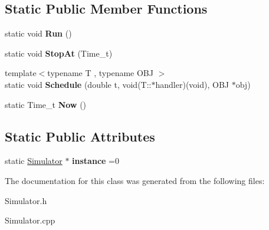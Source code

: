 \subsection*{Static Public Member Functions}
\begin{DoxyCompactItemize}
\item 
\hypertarget{class_simulator_a27e7045e7aa4e29e9d2003aaa09c8326}{static void {\bfseries Run} ()}\label{class_simulator_a27e7045e7aa4e29e9d2003aaa09c8326}

\item 
\hypertarget{class_simulator_a4bbb179ecbac8adfee23bd49d19746c0}{static void {\bfseries Stop\-At} (Time\-\_\-t)}\label{class_simulator_a4bbb179ecbac8adfee23bd49d19746c0}

\item 
\hypertarget{class_simulator_ae9f1c5a28f2fc0d42ccead5d7d2a642d}{{\footnotesize template$<$typename T , typename O\-B\-J $>$ }\\static void {\bfseries Schedule} (double t, void(T\-::$\ast$handler)(void), O\-B\-J $\ast$obj)}\label{class_simulator_ae9f1c5a28f2fc0d42ccead5d7d2a642d}

\item 
\hypertarget{class_simulator_a4a9507b155c22a9c5f119abb2d2d6fc1}{static Time\-\_\-t {\bfseries Now} ()}\label{class_simulator_a4a9507b155c22a9c5f119abb2d2d6fc1}

\end{DoxyCompactItemize}
\subsection*{Static Public Attributes}
\begin{DoxyCompactItemize}
\item 
\hypertarget{class_simulator_a12033735d8c6b88db2aaf72113481f97}{static \hyperlink{class_simulator}{Simulator} $\ast$ {\bfseries instance} =0}\label{class_simulator_a12033735d8c6b88db2aaf72113481f97}

\end{DoxyCompactItemize}


The documentation for this class was generated from the following files\-:\begin{DoxyCompactItemize}
\item 
Simulator.\-h\item 
Simulator.\-cpp\end{DoxyCompactItemize}
